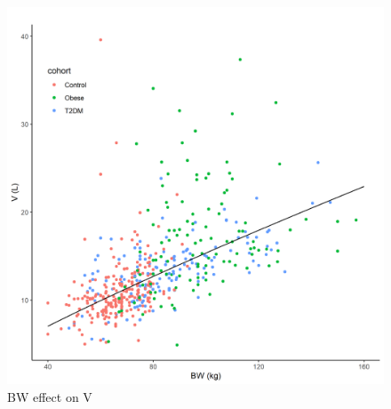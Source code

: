 \documentclass[utf8]{frontiersSCNS} %
\begin{document}
\begin{figure}[h!]
\begin{center}
\includegraphics[width=15cm]{V_BW.PNG}
\end{center}
\caption{BW effect on V}
\label{fig: V_BW}
\end{figure}
\end{document}

